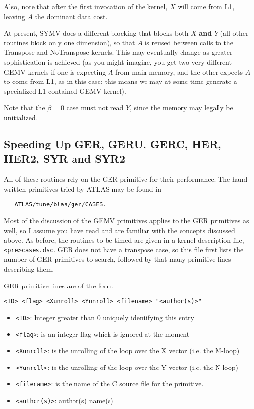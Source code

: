 \documentclass[11pt]{article}
\begin{document}
{Also, note that after the first invocation of the kernel, $X$ will come
from L1, leaving $A$ the dominant data cost.

At present, SYMV does a different blocking that blocks both $X$ {\bf and}
$Y$ (all other routines block only one dimension), so that $A$ is reused
between calls to the Transpose and NoTranspose kernels.  This may
eventually change as greater sophistication is achieved (as you might
imagine, you get two very different GEMV kernels if one is expecting
$A$ from main memory, and the other expects $A$ to come from L1, as
in this case; this means we may at some time generate a specialized
L1-contained GEMV kernel).

Note that the $\beta = 0$ case must not read $Y$, since the memory may
legally be unitialized.

\subsection{Speeding Up GER, GERU, GERC, HER, HER2, SYR and SYR2}
All of these routines rely on the GER primitive for their performance.  The
hand-written primitives tried by ATLAS may be found in
\begin{verbatim}
   ATLAS/tune/blas/ger/CASES.
\end{verbatim}

Most of the discussion of the GEMV primitives applies to the GER primitives
as well, so I assume you have read and are familiar with the concepts
discussed above.  As before, the routines to be timed are given
in a kernel description file, \verb+<pre>cases.dsc+.  GER does not have a
transpose case, so this file first lists the number of GER primitives to search,
followed by that many primitive lines describing them.

GER primitive lines are of the form:
\begin{verbatim}
<ID> <flag> <Xunroll> <Yunroll> <filename> "<author(s)>"
\end{verbatim}

\begin{itemize}
\item \verb+<ID>+: Integer greater than 0 uniquely identifying this entry
\item \verb+<flag>+: is an integer flag which is ignored at the moment
\item \verb+<Xunroll>+: is the unrolling of the loop over the X vector
      (i.e. the M-loop)
\item \verb+<Yunroll>+: is the unrolling of the loop over the Y vector
      (i.e. the N-loop)
\item \verb+<filename>+: is the name of the C source file for the primitive.
\item \verb+<author(s)>+: author(s) name(s)
\end{itemize}

}
\end{document}
